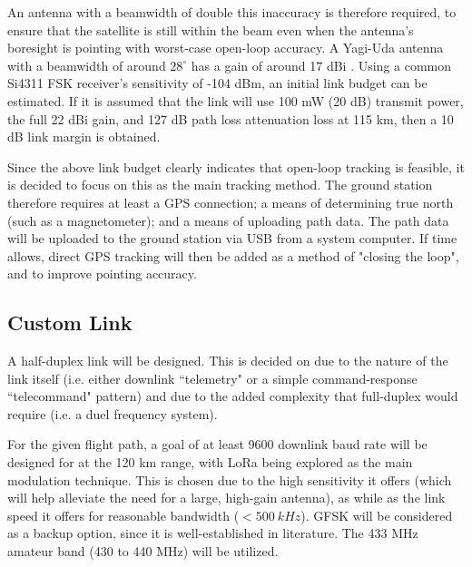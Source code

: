 An antenna with a beamwidth of double this inaccuracy is therefore required, to ensure that the satellite is still within the beam even when the antenna's boresight is pointing with worst-case open-loop accuracy. A Yagi-Uda antenna with a beamwidth of around $28^\circ$ has a gain of around 17 dBi \cite{paper-yagiGainBeamwidth}. Using a common Si4311 FSK receiver's sensitivity of -104 dBm, an initial link budget can be estimated. If it is assumed that the link will use 100 mW (20 dB) transmit power, the full 22 dBi gain, and 127 dB path loss attenuation loss at 115 km, then a 10 dB link margin is obtained.

Since the above link budget clearly indicates that open-loop tracking is feasible, it is decided to focus on this as the main tracking method. The ground station therefore requires at least a GPS connection; a means of determining true north (such as a magnetometer); and a means of uploading path data. The path data will be uploaded to the ground station via USB from a system computer. If time allows, direct GPS tracking will then be added as a method of "closing the loop", and to improve pointing accuracy.

\subsection{Custom Link}
A half-duplex link will be designed. This is decided on due to the nature of the link itself (i.e. either downlink ``telemetry" or a simple command-response ``telecommand" pattern) and due to the added complexity that full-duplex would require (i.e. a duel frequency system).

For the given flight path, a goal of at least 9600 downlink baud rate will be designed for at the 120 km range, with LoRa being explored as the main modulation technique. This is chosen due to the high sensitivity it offers (which will help alleviate the need for a large, high-gain antenna), as while as the link speed it offers for reasonable bandwidth ($< \SI{500}{kHz}$). GFSK will be considered as a backup option, since it is well-established in literature. The 433 MHz amateur band (430 to 440 MHz) will be utilized.